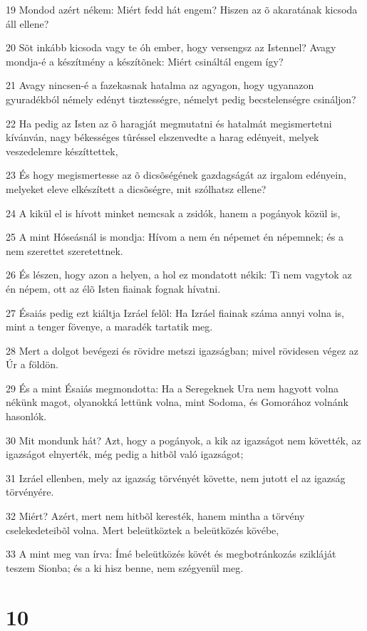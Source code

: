 \par 19 Mondod azért nékem: Miért fedd hát engem? Hiszen az õ akaratának kicsoda áll ellene?
\par 20 Sõt inkább kicsoda vagy te óh ember, hogy versengsz az Istennel? Avagy mondja-é a készítmény a készítõnek: Miért csináltál engem így?
\par 21 Avagy nincsen-é a fazekasnak hatalma az agyagon, hogy ugyanazon gyuradékból némely edényt tisztességre, némelyt pedig becstelenségre csináljon?
\par 22 Ha pedig az Isten az õ haragját megmutatni és hatalmát megismertetni kívánván, nagy békességes tûréssel elszenvedte a harag edényeit, melyek veszedelemre készíttettek,
\par 23 És hogy megismertesse az õ dicsõségének gazdagságát az irgalom edényein, melyeket eleve elkészített a dicsõségre, mit szólhatsz ellene?
\par 24 A kikül el is hívott minket nemcsak a zsidók, hanem a pogányok közül is,
\par 25 A mint Hóseásnál is mondja: Hívom a nem én népemet én népemnek; és a nem szerettet szeretettnek.
\par 26 És lészen, hogy azon a helyen, a hol ez mondatott nékik: Ti nem vagytok az én népem, ott az élõ Isten fiainak fognak hívatni.
\par 27 Ésaiás pedig ezt kiáltja Izráel felõl: Ha Izráel fiainak száma annyi volna is, mint a tenger fövenye, a maradék tartatik meg.
\par 28 Mert a dolgot bevégezi és rövidre metszi igazságban; mivel rövidesen végez az Úr a földön.
\par 29 És a mint Ésaiás megmondotta: Ha a Seregeknek Ura nem hagyott volna nékünk magot, olyanokká lettünk volna, mint Sodoma, és Gomorához volnánk hasonlók.
\par 30 Mit mondunk hát? Azt, hogy a pogányok, a kik az igazságot nem követték, az igazságot elnyerték, még pedig a hitbõl való igazságot;
\par 31 Izráel ellenben, mely az igazság törvényét követte, nem jutott el az igazság törvényére.
\par 32 Miért? Azért, mert nem hitbõl keresték, hanem mintha a törvény cselekedeteibõl volna. Mert beleütköztek a beleütközés kövébe,
\par 33 A mint meg van írva: Ímé beleütközés kövét és megbotránkozás szikláját teszem Sionba; és a ki hisz benne, nem szégyenül meg.

\chapter{10}

